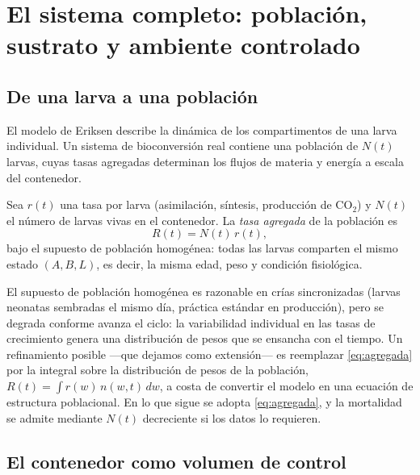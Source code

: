 \section{El sistema completo: población, sustrato y ambiente controlado}\label{sec:sistema}

\subsection{De una larva a una población}

El modelo de Eriksen describe la dinámica de los compartimentos de una larva
individual. Un sistema de bioconversión real contiene una población de
$N(t)$ larvas, cuyas tasas agregadas determinan los flujos de materia y
energía a escala del contenedor.

\begin{definition}\label{def31}
Sea $r(t)$ una tasa por larva (asimilación, síntesis, producción de CO$_2$)
y $N(t)$ el número de larvas vivas en el contenedor. La \emph{tasa agregada}
de la población es
\begin{equation}
R(t) = N(t)\,r(t),
\label{eq:agregada}
\end{equation}
bajo el supuesto de población homogénea: todas las larvas comparten el mismo
estado $(A, B, L)$, es decir, la misma edad, peso y condición fisiológica.
\end{definition}

\begin{remark}\label{rem:homogeneidad}
El supuesto de población homogénea es razonable en crías sincronizadas
(larvas neonatas sembradas el mismo día, práctica estándar en producción),
pero se degrada conforme avanza el ciclo: la variabilidad individual en las
tasas de crecimiento genera una distribución de pesos que se ensancha con el
tiempo. Un refinamiento posible ---que dejamos como extensión--- es
reemplazar \eqref{eq:agregada} por la integral sobre la distribución de
pesos de la población, $R(t) = \int r(w)\,n(w,t)\,dw$, a costa de convertir
el modelo en una ecuación de estructura poblacional. En lo que sigue se
adopta \eqref{eq:agregada}, y la mortalidad se admite mediante $N(t)$
decreciente si los datos lo requieren.
\end{remark}

\subsection{El contenedor como volumen de control}


